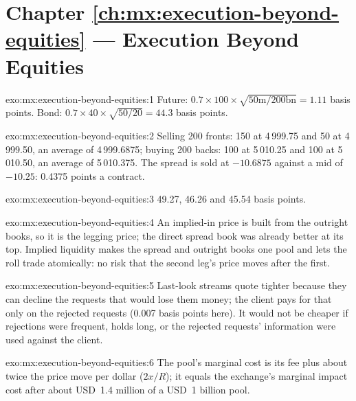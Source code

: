 \section*{Chapter \ref{ch:mx:execution-beyond-equities} --- Execution Beyond Equities}

\begin{solution}{exo:mx:execution-beyond-equities:1}
Future: $0.7\times100\times\sqrt{50\text{m}/200\text{bn}}=1.11$ basis points. Bond: $0.7\times40\times\sqrt{50/20}=44.3$ basis points.
\end{solution}

\begin{solution}{exo:mx:execution-beyond-equities:2}
Selling 200 fronts: 150 at 4\,999.75 and 50 at 4\,999.50, an average of 4\,999.6875; buying 200 backs: 100 at 5\,010.25 and 100 at 5\,010.50, an average of
5\,010.375. The spread is sold at $-10.6875$ against a mid of $-10.25$: 0.4375 points a contract.
\end{solution}

\begin{solution}{exo:mx:execution-beyond-equities:3}
49.27, 46.26 and 45.54 basis points.
\end{solution}

\begin{solution}{exo:mx:execution-beyond-equities:4}
An implied-in price is built from the outright books, so it is the legging price; the direct spread book was already better at its top. Implied
liquidity makes the spread and outright books one pool and lets the roll trade atomically: no risk that the second leg's price moves after the first.
\end{solution}

\begin{solution}{exo:mx:execution-beyond-equities:5}
Last-look streams quote tighter because they can decline the requests that would lose them money; the client pays for that only on the rejected
requests (0.007 basis points here). It would not be cheaper if rejections were frequent, holds long, or the rejected requests' information were used
against the client.
\end{solution}

\begin{solution}{exo:mx:execution-beyond-equities:6}
The pool's marginal cost is its fee plus about twice the price move per dollar ($2x/R$); it equals the exchange's marginal impact cost after about
USD~1.4 million of a USD~1 billion pool.
\end{solution}

